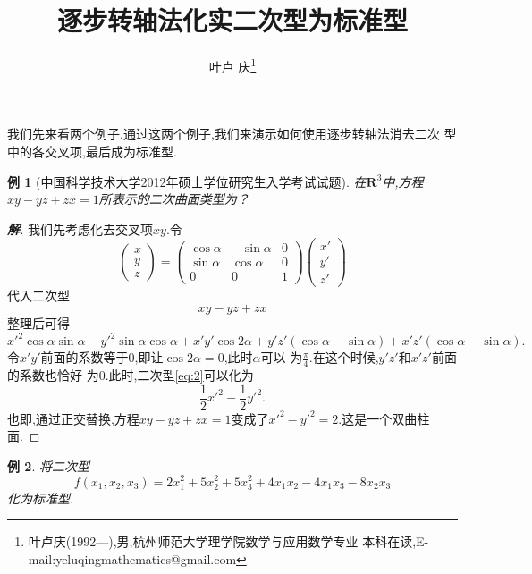 \documentclass[a4paper]{article}
\newtheorem{exa}{例}
\newenvironment{example}
{\bigskip\begin{mdframed}\begin{exa}}
    {\end{exa}\end{mdframed}\bigskip}
\begin{document}
\title{\huge{\bf{逐步转轴法化实二次型为标准型}}} \author{\small{叶卢
    庆\footnote{叶卢庆(1992---),男,杭州师范大学理学院数学与应用数学专业
      本科在读,E-mail:yeluqingmathematics@gmail.com}}}
\maketitle
我们先来看两个例子.通过这两个例子,我们来演示如何使用逐步转轴法消去二次
型中的各交叉项,最后成为标准型.
\begin{example}[中国科学技术大学2012年硕士学位研究生入学考试试题]
  在$\mathbf{R}^3$中,方程$xy-yz+zx=1$所表示的二次曲面类型为？
\end{example}
\begin{proof}[\textbf{解}]
  我们先考虑化去交叉项$xy$.令
$$
\begin{pmatrix}
  x\\
  y\\
  z
\end{pmatrix}=
\begin{pmatrix}
  \cos\alpha&-\sin\alpha&0\\
  \sin\alpha&\cos\alpha&0\\
  0&0&1
\end{pmatrix}
\begin{pmatrix}
  x'\\
  y'\\
  z'
\end{pmatrix}
$$
代入二次型
\begin{equation}
  \label{eq:1}
  xy-yz+zx
\end{equation}
整理后可得
\begin{equation}
  \label{eq:2}
  x'^{2}\cos\alpha\sin\alpha-y'^{2}\sin\alpha\cos\alpha+x'y'\cos
  2\alpha+y'z'(\cos\alpha-\sin\alpha)+x'z'(\cos\alpha-\sin\alpha).
\end{equation}
令$x'y'$前面的系数等于$0$,即让$\cos 2\alpha=0$,此时$\alpha$可以
为$\frac{\pi}{4}$.在这个时候,$y'z'$和$x'z'$前面的系数也恰好
为$0$.此时,二次型\eqref{eq:2}可以化为
$$
\frac{1}{2}x'^2-\frac{1}{2}y'^2.
$$
也即,通过正交替换,方程$xy-yz+zx=1$变成了$x'^2-y'^2=2$.这是一个双曲柱面.
\end{proof}
\begin{example}
  将二次型
$$
f(x_{1},x_2,x_3)=2x_{1}^{2} + 5x_{2}^{2} +
5x_{3}^{2}+4x_{1}x_{2}-4x_{1}x_{3} - 8x_{2}x_3
$$
化为标准型.
\end{example}
\end{document}

